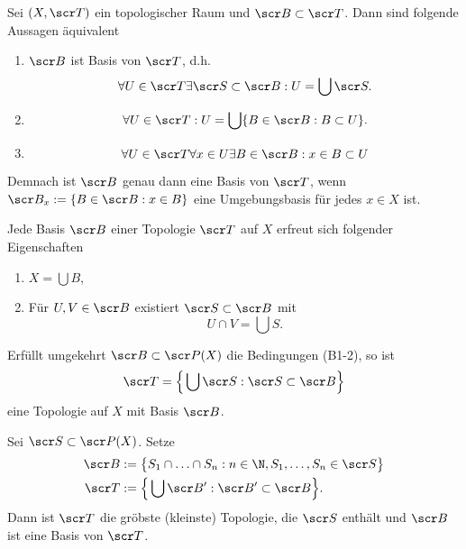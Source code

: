 
\begin{prop}
	Sei $(X, \scr T)$ ein topologischer Raum und $\scr B \subset \scr T$.
	Dann sind folgende Aussagen äquivalent
	\begin{enumerate}[1)]
		\item
			$\scr B$ ist Basis von $\scr T$, d.h.
			\[
				\forall U \in \scr T \exists \scr S \subset \scr B : U = \bigcup \scr S.
			\]
		\item
			\[
				\forall U \in \scr T : U = \bigcup \{ B \in \scr B : B \subset U \}.
			\]
		\item
			\[
				\forall U \in \scr T \forall x \in U \exists B \in \scr B : x \in B \subset U
			\]
	\end{enumerate}
	Demnach ist $\scr B$ genau dann eine Basis von $\scr T$, wenn $\scr B_x := \{ B \in \scr B : x \in B \}$ eine Umgebungsbasis für jedes $x \in X$ ist.
\end{prop}

\begin{st}
	Jede Basis $\scr B$ einer Topologie $\scr T$ auf $X$ erfreut sich folgender Eigenschaften
	\begin{enumerate}[(B1)]
		\item
			$X = \bigcup B$,
		\item
			Für $U, V \in \scr B$ existiert $\scr S \subset \scr B$ mit
			\[
				U \cap V = \bigcup S.
			\]
	\end{enumerate}
	Erfüllt umgekehrt $\scr B \subset \scr P(X)$ die Bedingungen (B1-2), so ist
	\[
		\scr T = \Big\{ \bigcup \scr S : \scr S \subset \scr B \Big\}
	\]
	eine Topologie auf $X$ mit Basis $\scr B$.
\end{st}

\begin{st}
	Sei $\scr S \subset \scr P(X)$.
	Setze
	\begin{align*}
		\scr B &:= \big\{ S_1 \cap \dotsc \cap S_n : n \in \N, S_1, \dotsc, S_n \in \scr S \big\} \\
		\scr T &:= \Big\{ \bigcup \scr B' : \scr B' \subset \scr B \Big\}.
	\end{align*}
	Dann ist $\scr T$ die gröbste (kleinste) Topologie, die $\scr S$ enthält und $\scr B$ ist eine Basis von $\scr T$.
\end{st}

